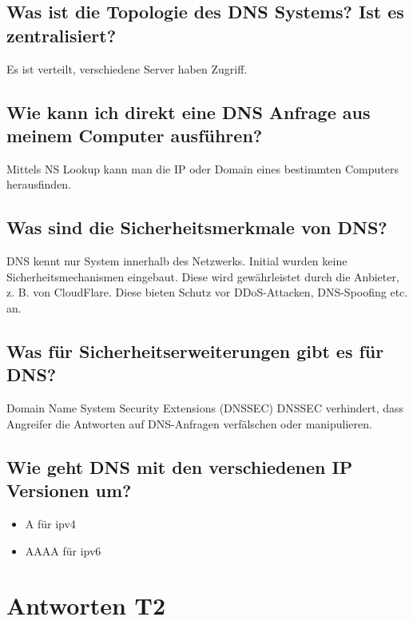 \subsection*{Was ist die Topologie des DNS Systems? Ist es zentralisiert?}
Es ist verteilt, verschiedene Server haben Zugriff.

\subsection*{Wie kann ich direkt eine DNS Anfrage aus meinem Computer ausführen?}
Mittels NS Lookup kann man die IP oder Domain eines bestimmten Computers herausfinden.

\subsection*{Was sind die Sicherheitsmerkmale von DNS?}
DNS kennt nur System innerhalb des Netzwerks. Initial wurden keine Sicherheitsmechanismen eingebaut. Diese wird gewährleistet durch die Anbieter, z. B. von CloudFlare. Diese bieten Schutz vor DDoS-Attacken, DNS-Spoofing etc. an.

\subsection*{Was für Sicherheitserweiterungen gibt es für DNS?}
Domain Name System Security Extensions (DNSSEC) DNSSEC verhindert, dass Angreifer die Antworten auf DNS-Anfragen verfälschen oder manipulieren.

\subsection*{Wie geht DNS mit den verschiedenen IP Versionen um?}
\begin{itemize}
    \item A für ipv4
    \item AAAA für ipv6
\end{itemize}

\section{Antworten T2}
